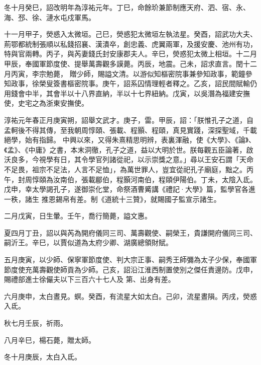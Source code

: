 \begin{pinyinscope}
 冬十月癸巳，詔改明年為淳祐元年。丁巳，命餘玠兼節制應天府、泗、宿、永、海、邳、徐、漣水屯戍軍馬。



 十一月甲子，熒惑入太微垣。己巳，熒惑犯太微垣左執法星。癸酉，詔武功大夫、荊鄂都統制張順以私錢招襄、漢潰卒，創忠義、虎翼兩軍，及援安慶、池州有功，特與官兩轉。丙子，與芮妻錢氏封安康郡夫人。辛巳，熒惑犯太微上相垣。十二月甲辰，奉國軍節度使、提舉萬壽觀多謨薨。丙辰，地震。己未，詔求直言。閏十二月丙寅，李宗勉薨，
 贈少師，賜謚文清。以游似知樞密院事兼參知政事，範鐘參知政事，徐榮叟簽書樞密院事。庚午，詔系囚情理輕者釋之。乙亥，詔民間賦輸仍用錢會中半，其會半以十八界直納，半以十七界紐納。戊寅，以吳潛為福建安撫使，史宅之為浙東安撫使。



 淳祐元年春正月庚寅朔，詔舉文武才。庚子，雷。甲辰，詔：「朕惟孔子之道，自孟軻後不得其傳，至我朝周惇頤、張載、程顥、程頤，真見實踐，深探聖域，千載絕學，始有指歸。
 中興以來，又得朱熹精思明辨，表裏渾融，使《大學》、《論》、《孟》、《中庸》之書，本末洞徹，孔子之道，益以大明於世。朕每觀五臣論著，啟沃良多，今視學有日，其令學官列諸從祀，以示崇獎之意。」尋以王安石謂「天命不足畏，祖宗不足法，人言不足恤」，為萬世罪人，豈宜從祀孔子廟庭，黜之。丙午，封周惇頤為汝南伯，張載郿伯，程顥河南伯，程頤伊陽伯。丁未，太陰入氐。戊申，幸太學謁孔子，遂御崇化堂，命祭酒曹觱講《禮記·大學》篇，監學官各進一秩，諸生
 推恩錫帛有差。制《道統十三贊》，就賜國子監宣示諸生。



 二月戊寅，日生暈。壬午，喬行簡薨，謚文惠。



 夏四月丁丑，詔以與芮為開府儀同三司、萬壽觀使、嗣榮王，貴謙開府儀同三司、嗣沂王。辛巳，以賈似道為太府少卿、湖廣總領財賦。



 五月庚寅，以少師、保寧軍節度使、判大宗正事、嗣秀王師彌為太子少保，奉國軍節度使充萬壽觀使師貢為少師。己亥，詔沿江淮西制置使別之傑任責邊防。戊申，賜禮部進士徐儼夫以下三百六十七人及
 第、出身有差。



 六月庚申，太白晝見。螟。癸酉，有流星大如太白。己卯，流星晝隕。丙戌，熒惑入氐。



 秋七月壬辰，祈雨。



 八月辛巳，楊石薨，贈太師。



 冬十月庚辰，太白入氐。




\end{pinyinscope}
